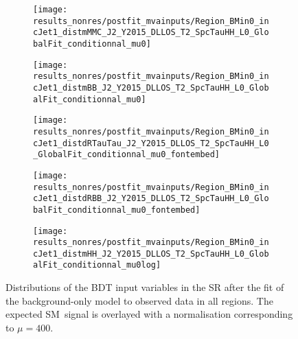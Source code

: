 \begin{figure}[htbp]
  \centering

  \begin{subfigure}{0.46\textwidth}
    \texttt{[image: results\_nonres/postfit\_mvainputs/Region\_BMin0\_incJet1\_distmMMC\_J2\_Y2015\_DLLOS\_T2\_SpcTauHH\_L0\_GlobalFit\_conditionnal\_mu0]}
  \end{subfigure}\hfill%
  \begin{subfigure}{0.46\textwidth}
    \texttt{[image: results\_nonres/postfit\_mvainputs/Region\_BMin0\_incJet1\_distmBB\_J2\_Y2015\_DLLOS\_T2\_SpcTauHH\_L0\_GlobalFit\_conditionnal\_mu0]}
  \end{subfigure}

  \begin{subfigure}{0.46\textwidth}
    \texttt{[image: results\_nonres/postfit\_mvainputs/Region\_BMin0\_incJet1\_distdRTauTau\_J2\_Y2015\_DLLOS\_T2\_SpcTauHH\_L0\_GlobalFit\_conditionnal\_mu0\_fontembed]}
  \end{subfigure}\hfill%
  \begin{subfigure}{0.46\textwidth}
    \texttt{[image: results\_nonres/postfit\_mvainputs/Region\_BMin0\_incJet1\_distdRBB\_J2\_Y2015\_DLLOS\_T2\_SpcTauHH\_L0\_GlobalFit\_conditionnal\_mu0\_fontembed]}
  \end{subfigure}

  \begin{subfigure}{0.46\textwidth}
    \texttt{[image: results\_nonres/postfit\_mvainputs/Region\_BMin0\_incJet1\_distmHH\_J2\_Y2015\_DLLOS\_T2\_SpcTauHH\_L0\_GlobalFit\_conditionnal\_mu0log]}
  \end{subfigure}

  \caption[Distributions of the BDT input variables in the \hadhad SR after the
  background-only fit.]{Distributions of the BDT input variables in the \hadhad
    SR after the fit of the background-only model to observed data in all
    regions. The expected SM~\HH signal is overlayed with a normalisation
    corresponding to $\mu = 400$.}%
  \label{fig:postfit_mva_inputs}
\end{figure}


